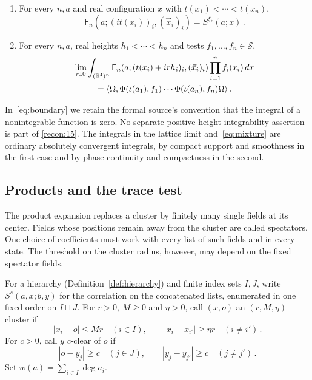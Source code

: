 \begin{definition}
\begin{enumerate}[label=\textup{R\arabic*.},ref=R\arabic*]
\item\label{recon:14} For every $n,a$ and real configuration $x$ with $t(x_1)<\cdots<t(x_n)$,
\begin{equation}\label{eq:euclidean-root}
\mathsf F_n(a;(it(x_i))_i,(\vec x_i)_i)=S^{\xi_*}(a;x)\,.
\end{equation}
\item\label{recon:15} For every $n,a$, real heights $h_1<\cdots<h_n$ and tests $f_1,\ldots,f_n\in\mathcal S$,
\begin{multline}\label{eq:boundary}
\lim_{r\downarrow0}\int_{(\mathbb R^4)^n}\mathsf F_n(a;(t(x_i)+irh_i)_i,(\vec x_i)_i)\prod_{i=1}^n f_i(x_i)\,dx\\
=\langle\Omega,\Phi(\iota(a_1),f_1)\cdots\Phi(\iota(a_n),f_n)\Omega\rangle\,.
\end{multline}
\end{enumerate}
\end{definition}

In~\eqref{eq:boundary} we retain the formal source's convention that the integral of a nonintegrable function is zero.
No separate positive-height integrability assertion is part of \ref{recon:15}.
The integrals in the lattice limit and~\eqref{eq:mixture} are ordinary absolutely convergent integrals, by compact support and smoothness in the first case and by phase continuity and compactness in the second.

\subsection{Products and the trace test}\label{subsec:products}

The product expansion replaces a cluster by finitely many single fields at its center.
Fields whose positions remain away from the cluster are called spectators.
One choice of coefficients must work with every list of such fields and in every state.
The threshold on the cluster radius, however, may depend on the fixed spectator fields.

\begin{definition}\label{def:cluster}
For a hierarchy (Definition~\ref{def:hierarchy}) and finite index sets $I,J$, write $S^s(a,x;b,y)$ for the correlation on the concatenated lists, enumerated in one fixed order on $I\sqcup J$.
For $r>0$, $M\ge0$ and $\eta>0$, call $(x,o)$ an $(r,M,\eta)$-cluster if
\begin{equation}\label{eq:cluster}
|x_i-o|\le Mr\quad(i\in I),
\qquad |x_i-x_{i'}|\ge\eta r\quad(i\ne i')\,.
\end{equation}
For $c>0$, call $y$ $c$-clear of $o$ if
\begin{equation}\label{eq:clear}
|o-y_j|\ge c\quad(j\in J),
\qquad |y_j-y_{j'}|\ge c\quad(j\ne j')\,.
\end{equation}
Set $w(a)=\sum_{i\in I}\deg a_i$.
\end{definition}

